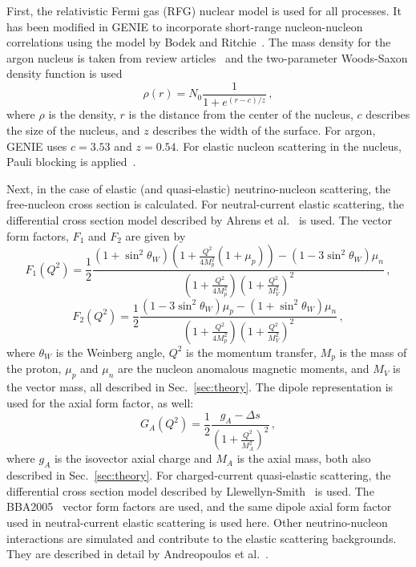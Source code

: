     First, the relativistic Fermi gas (RFG) nuclear model is used for all
    processes. It has been modified in GENIE to incorporate short-range
    nucleon-nucleon correlations using the model by Bodek and
    Ritchie~\cite{BodekrRitchie}. The mass density for the argon nucleus is
    taken from review articles~\cite{nucdensity} and the two-parameter
    Woods-Saxon density function is used~\cite{WoodsSaxon}
    \begin{equation}\label{eq:woodssaxon}
      \rho(r) = N_0\frac{1}{1+e^{(r-c)/z}} \,,
    \end{equation}
    where $\rho$ is the density, $r$ is the distance from the center of the
    nucleus, $c$ describes the size of the nucleus, and $z$ describes the width
    of the surface. For argon, GENIE uses $c=3.53$ and $z=0.54$.  For elastic
    nucleon scattering in the nucleus, Pauli blocking is
    applied~\cite{PauliBlock}.
    
    Next, in the case of elastic (and quasi-elastic) neutrino-nucleon
    scattering, the free-nucleon cross section is calculated. For
    neutral-current elastic scattering, the differential cross section model
    described by Ahrens et al.~\cite{Ahrens} is used. The vector form
    factors, $F_1$ and $F_2$ are given by
    \begin{equation}
      F_1(Q^2) = \frac{1}{2}\frac{(1+\sin^2\theta_W)(1+\frac{Q^2}{4M_p^2}(1+\mu_p)) 
        - (1-3\sin^2\theta_W)\mu_n}
        {(1+\frac{Q^2}{4M_p^2})(1+\frac{Q^2}{M_V^2})^2} \,,
    \end{equation}
    \begin{equation}
      F_2(Q^2) = \frac{1}{2}\frac{(1-3\sin^2\theta_W)\mu_p - (1+\sin^2\theta_W)\mu_n}
         {(1+\frac{Q^2}{4M_p^2})(1+\frac{Q^2}{M_V^2})^2} \,,
    \end{equation}
    where $\theta_W$ is the Weinberg angle, $Q^2$ is the momentum transfer,
    $M_p$ is the mass of the proton, $\mu_p$ and $\mu_n$ are the nucleon
    anomalous magnetic moments, and $M_V$ is the vector mass, all described in
    Sec.~\ref{sec:theory}. The dipole representation is used for the axial
    form factor, as well:
    \begin{equation}
      G_A(Q^2) = \frac{1}{2}\frac{g_A - \Delta s}{(1+\frac{Q^2}{M_A^2})^2} \,,
    \end{equation}
    where $g_A$ is the isovector axial charge and $M_A$ is the axial mass, both
    also described in Sec.~\ref{sec:theory}. For charged-current quasi-elastic
    scattering, the differential cross section model described by
    Llewellyn-Smith~\cite{Llewellyn} is used. The BBA2005~\cite{BBA05} vector
    form factors are used, and the same dipole axial form factor used in
    neutral-current elastic scattering is used here. Other neutrino-nucleon
    interactions are simulated and contribute to the elastic scattering
    backgrounds. They are described in detail by Andreopoulos et
    al.~\cite{Andreopoulos:2015wxa}.

